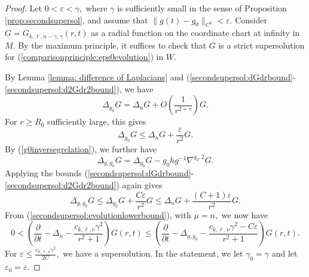 \documentclass[12pt]{amsart}
\newcommand{\p}{{ \partial}}
\renewcommand{\1}{{\mathbf 1}}
\newcommand{\R}{{\mathbb R}}
\renewcommand{\p}{{\partial}}
\newcommand{\eps}{{\varepsilon}}
\theoremstyle{others}
\numberwithin{equation}{section}
\begin{document}
    

    
    \begin{proof} Let $0 < \eps < \gamma,$ where $\gamma$ is sufficiently small in the sense of Proposition \ref{prop:secondsupersol}, and assume that 
     $\| g(t) - g_0 \|_{C^0} < \eps.$
    Consider $G = G_{k, \ell, n - \gamma, \gamma} (r, t)$ as a radial function on the coordinate chart at infinity in $M.$ By the maximum principle, it suffices to check that $G$ is a strict supersolution for (\ref{comparisonprinciple:eps0evolution}) in $W.$

By Lemma \ref{lemma: difference of Laplacians} and (\ref{secondsupersol:dGdrbound}-\ref{secondsupersol:d2Gdr2bound}), we have
$$\Delta_{g_0} G = \Delta_n G + O \left(\frac{1}{r^{2 + \tau}} \right) G.$$
For $r \geq R_0$ sufficiently large, this gives
$$\Delta_{g_0} G \leq \Delta_n G + \frac{\eps}{r^{2}}  G.$$
By (\ref{g0inversegrelation}), we further have
$$\Delta_{g, g_0} G = \Delta_{g_0} G - g_0 h g^{-1} \nabla^{g_0,2} G.$$
Applying the bounds (\ref{secondsupersol:dGdrbound}-\ref{secondsupersol:d2Gdr2bound}) again gives
$$\Delta_{g, g_0} G \leq \Delta_{g_0} G + \frac{C \eps}{r^2} G \leq \Delta_{n} G + \frac{(C + 1) \eps}{r^2} G.$$
From (\ref{secondsupersol:evolutionlowerbound}), with $\mu = n,$ we now have
\begin{equation}
0 < \left( \frac{\p}{\p t} - \Delta_{n} - \frac{ c_{k, \ell, \nu} \gamma^2 } { r^2 + 1 } \right) G(r,t) \leq \left( \frac{\p}{\p t} - \Delta_{g, g_0} - \frac{ c_{k, \ell, \nu} \gamma^2 - C \eps} { r^2 + 1 } \right) G(r,t).
\end{equation}
For $\eps \leq \frac{c_{k,\ell, \nu} \gamma^2}{2 C},$ we have a supersolution. In the statement, we let $\gamma_0 = \gamma$ and let $\eps_0 = \eps.$ %
    \end{proof}

    

\end{document}
